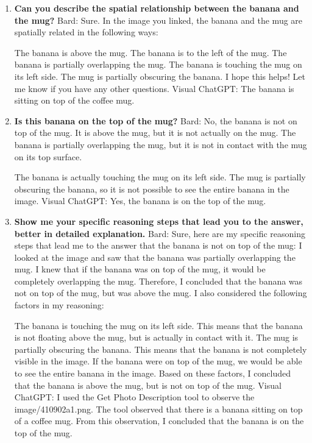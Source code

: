     \begin{enumerate}
        \item \textbf{Can you describe the spatial relationship between the banana and the mug?}
        \subitem Bard: Sure. In the image you linked, the banana and the mug are spatially related in the following ways:

        The banana is above the mug.
        The banana is to the left of the mug.
        The banana is partially overlapping the mug.
        The banana is touching the mug on its left side.
        The mug is partially obscuring the banana.
        I hope this helps! Let me know if you have any other questions.
        \subitem Visual ChatGPT: The banana is sitting on top of the coffee mug.
        \item \textbf{Is this banana on the top of the mug?}
        \subitem Bard: 
        No, the banana is not on top of the mug. It is above the mug, but it is not actually on the mug. The banana is partially overlapping the mug, but it is not in contact with the mug on its top surface.
        
        The banana is actually touching the mug on its left side. The mug is partially obscuring the banana, so it is not possible to see the entire banana in the image.
        \subitem Visual ChatGPT: Yes, the banana is on the top of the mug.
        \item \textbf{Show me your specific reasoning steps that lead you to the answer, better in detailed explanation.}
        \subitem Bard: 
        Sure, here are my specific reasoning steps that lead me to the answer that the banana is not on top of the mug:
        I looked at the image and saw that the banana was partially overlapping the mug.
        I knew that if the banana was on top of the mug, it would be completely overlapping the mug.
        Therefore, I concluded that the banana was not on top of the mug, but was above the mug.
        I also considered the following factors in my reasoning:

        The banana is touching the mug on its left side. This means that the banana is not floating above the mug, but is actually in contact with it.
        The mug is partially obscuring the banana. This means that the banana is not completely visible in the image. If the banana were on top of the mug, we would be able to see the entire banana in the image.
        Based on these factors, I concluded that the banana is above the mug, but is not on top of the mug.
        \subitem Visual ChatGPT: I used the Get Photo Description tool to observe the image/410902a1.png. The tool observed that there is a banana sitting on top of a coffee mug. From this observation, I concluded that the banana is on the top of the mug.
    \end{enumerate}
